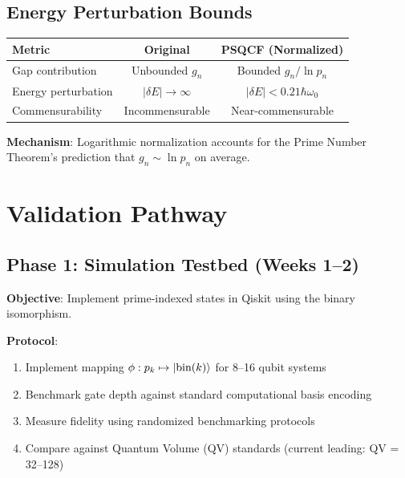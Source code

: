 \documentclass[12pt,a4paper]{article}
\begin{document}
\subsection{Energy Perturbation Bounds}

\begin{center}
\begin{tabular}{p{3.5cm}cc}
\toprule
\textbf{Metric} & \textbf{Original} & \textbf{PSQCF (Normalized)} \\
\midrule
Gap contribution & Unbounded $g_n$ & Bounded $g_n / \ln p_n$ \\
Energy perturbation & $|\delta E| \to \infty$ & $|\delta E| < 0.21\hbar\omega_0$ \\
Commensurability & Incommensurable & Near-commensurable \\
\bottomrule
\end{tabular}
\end{center}

\textbf{Mechanism}: Logarithmic normalization accounts for the Prime Number Theorem's prediction that $g_n \sim \ln p_n$ on average.

\section{Validation Pathway}
\label{sec:validation}

\subsection{Phase 1: Simulation Testbed (Weeks 1--2)}

\textbf{Objective}: Implement prime-indexed states in Qiskit using the binary isomorphism.

\textbf{Protocol}:
\begin{enumerate}
    \item Implement mapping $\phi: p_k \mapsto \ket{\text{bin}(k)}$ for 8--16 qubit systems
    \item Benchmark gate depth against standard computational basis encoding
    \item Measure fidelity using randomized benchmarking protocols
    \item Compare against Quantum Volume (QV) standards (current leading: QV = 32--128)
\end{enumerate}
\end{document}
